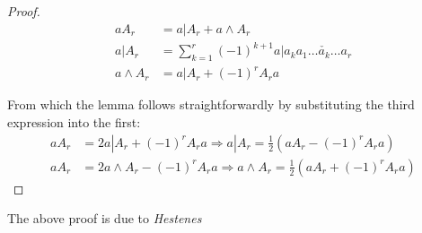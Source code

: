 \begin{proof}
	\begin{align*}
		aA_r &= a | A_r + a \wedge A_r \\
		a | A_r &= \sum_{k=1}^r (-1)^{k+1}a|a_k a_1 \ldots \check{a_k} \ldots a_r \\
		a \wedge A_r &= a | A_r + (-1)^rA_ra
	\end{align*}

	From which the lemma follows straightforwardly by substituting the third expression into the first:
	\begin{align*}
		aA_r &= 2a | A_r + (-1)^rA_ra \Rightarrow a | A_r = \frac{1}{2} (aA_r - (-1)^rA_ra) \\
		aA_r &= 2a \wedge A_r - (-1)^rA_ra \Rightarrow a \wedge A_r = \frac{1}{2} (aA_r + (-1)^rA_ra)
	\end{align*}
\end{proof}

The above proof is due to \textit{Hestenes} \cite[p. 8-10]{ga-origin}
